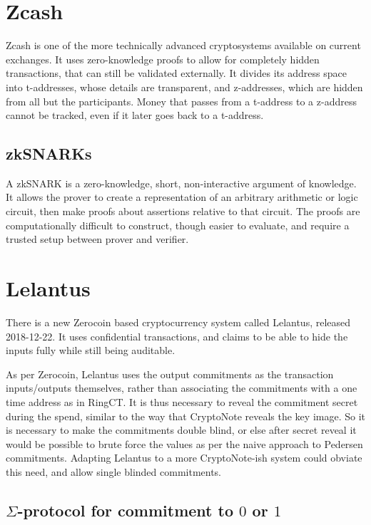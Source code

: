 \documentclass{article}
\begin{document}
\section{Zcash}

Zcash is one of the more technically advanced cryptosystems available on current exchanges.  It uses zero-knowledge proofs to allow for completely hidden transactions, that can still be validated externally.  It divides its address space into t-addresses, whose details are transparent, and z-addresses, which are hidden from all but the participants.  Money that passes from a t-address to a z-address cannot be tracked, even if it later goes back to a t-address.


\subsection{zkSNARKs}

A zkSNARK is a zero-knowledge, short, non-interactive argument of knowledge.  It allows the prover to create a representation of an arbitrary arithmetic or logic circuit, then make proofs about assertions relative to that circuit.  The proofs are computationally difficult to construct, though easier to evaluate, and require a trusted setup between prover and verifier.



\section{Lelantus}

There is a new Zerocoin based cryptocurrency system called Lelantus, released 2018-12-22.  It uses confidential transactions, and claims to be able to hide the inputs fully while still being auditable.  

As per Zerocoin, Lelantus uses the output commitments as the transaction inputs/outputs themselves, rather than associating the commitments with a one time address as in RingCT.  It is thus necessary to reveal the commitment secret during the spend, similar to the way that CryptoNote reveals the key image.  So it is necessary to make the commitments double blind, or else after secret reveal it would be possible to brute force the values as per the naive approach to Pedersen commitments.  Adapting Lelantus to a more CryptoNote-ish system could obviate this need, and allow single blinded commitments.


\subsection{$\Sigma$-protocol for commitment to $0$ or $1$}
\end{document}
